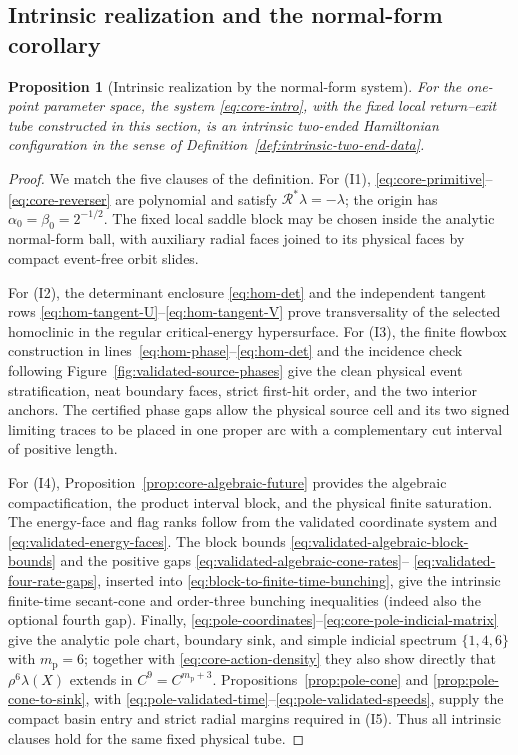 \documentclass[11pt]{amsart}
\numberwithin{equation}{section}
\newtheorem{proposition}[theorem]{Proposition}
\theoremstyle{definition}
\theoremstyle{remark}
\begin{document}
\subsection{Intrinsic realization and the normal-form corollary}

\begin{proposition}[Intrinsic realization by the normal-form system]
\label{prop:core-intrinsic-realization}
For the one-point parameter space, the system
\eqref{eq:core-intro}, with the fixed local return--exit tube constructed
in this section, is an intrinsic two-ended Hamiltonian configuration in
the sense of Definition~\ref{def:intrinsic-two-end-data}.
\end{proposition}

\begin{proof}
We match the five clauses of the definition.  For \textup{(I1)},
\eqref{eq:core-primitive}--\eqref{eq:core-reverser} are polynomial and
satisfy $\mathcal R^*\lambda=-\lambda$; the origin has
$\alpha_0=\beta_0=2^{-1/2}$.  The fixed local saddle block may be chosen
inside the analytic normal-form ball, with auxiliary radial faces joined
to its physical faces by compact event-free orbit slides.

For \textup{(I2)}, the determinant enclosure
\eqref{eq:hom-det} and the independent tangent rows
\eqref{eq:hom-tangent-U}--\eqref{eq:hom-tangent-V} prove transversality of
the selected homoclinic in the regular critical-energy hypersurface.  For
\textup{(I3)}, the finite flowbox construction in
lines~\eqref{eq:hom-phase}--\eqref{eq:hom-det} and the incidence check
following Figure~\ref{fig:validated-source-phases} give the clean physical
event stratification, neat boundary faces, strict first-hit order, and the
two interior anchors.  The certified phase gaps allow the physical source
cell and its two signed limiting traces to be placed in one proper arc
with a complementary cut interval of positive length.

For \textup{(I4)}, Proposition~\ref{prop:core-algebraic-future} provides
the algebraic compactification, the product interval block, and the
physical finite saturation.  The energy-face and flag ranks follow from
the validated coordinate system and
\eqref{eq:validated-energy-faces}.  The block bounds
\eqref{eq:validated-algebraic-block-bounds} and the positive gaps
\eqref{eq:validated-algebraic-cone-rates}--
\eqref{eq:validated-four-rate-gaps}, inserted into
\eqref{eq:block-to-finite-time-bunching}, give the intrinsic finite-time
secant-cone and order-three bunching inequalities (indeed also the optional
fourth gap).  Finally,
\eqref{eq:pole-coordinates}--\eqref{eq:core-pole-indicial-matrix} give the
analytic pole chart, boundary sink, and simple indicial spectrum
$\{1,4,6\}$ with $m_{\mathrm p}=6$; together with
\eqref{eq:core-action-density} they also show directly that
$\rho^6\lambda(X)$ extends in $C^9=C^{m_{\mathrm p}+3}$.
Propositions~\ref{prop:pole-cone}
and \ref{prop:pole-cone-to-sink}, with
\eqref{eq:pole-validated-time}--\eqref{eq:pole-validated-speeds}, supply
the compact basin entry and strict radial margins required in
\textup{(I5)}.  Thus all
intrinsic clauses hold for the same fixed physical tube.
\end{proof}
\end{document}
